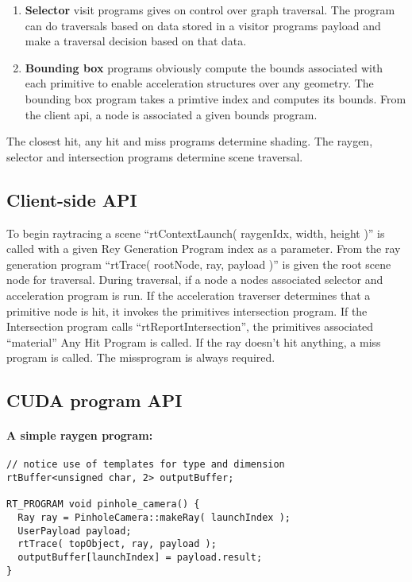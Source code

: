 \begin{enumerate}
	\item{\textbf{Selector}
		visit programs gives on control over graph traversal.
		The program can do traversals based on data stored in a visitor programs payload and make a traversal decision based 	on that data.
	}

 \item{\textbf{Bounding box}
		programs obviously compute the bounds associated with each primitive to enable acceleration structures over any geometry. The bounding box program takes a primtive index and computes its bounds. From the client api, a node is associated a given bounds program.
	}
 				
\end{enumerate}

The closest hit, any hit and miss programs determine shading. The raygen, selector and intersection programs determine scene traversal.
			 
\subsection{Client-side API}

To begin raytracing a scene ``rtContextLaunch( raygenIdx, width, height )'' is called with a given Rey Generation Program index as a parameter. From the ray generation program ``rtTrace( rootNode, ray, payload )'' is given the root scene node for traversal. During traversal, if a node a nodes associated selector and acceleration program is run.
If the acceleration traverser determines that a primitive node is hit, it invokes the primitives intersection program.
If the Intersection program calls ``rtReportIntersection'', the primitives associated ``material'' Any Hit Program is called.
If the ray doesn't hit anything, a miss program is called. The missprogram is always required.

\subsection{CUDA program API}

\paragraph{A simple raygen program:}

\begin{verbatim}
// notice use of templates for type and dimension
rtBuffer<unsigned char, 2> outputBuffer; 

RT_PROGRAM void pinhole_camera() {
  Ray ray = PinholeCamera::makeRay( launchIndex );
  UserPayload payload;
  rtTrace( topObject, ray, payload );
  outputBuffer[launchIndex] = payload.result;
}
\end{verbatim}
